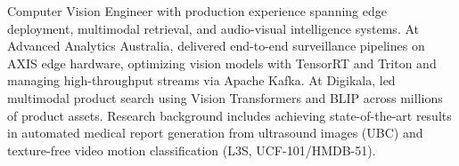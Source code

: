 \small{Computer Vision Engineer with production experience spanning edge deployment, multimodal retrieval, and audio-visual intelligence systems. At Advanced Analytics Australia, delivered end-to-end surveillance pipelines on AXIS edge hardware, optimizing vision models with TensorRT and Triton and managing high-throughput streams via Apache Kafka. At Digikala, led multimodal product search using Vision Transformers and BLIP across millions of product assets. Research background includes achieving state-of-the-art results in automated medical report generation from ultrasound images (UBC) and texture-free video motion classification (L3S, UCF-101/HMDB-51).}\vspace{4pt}
